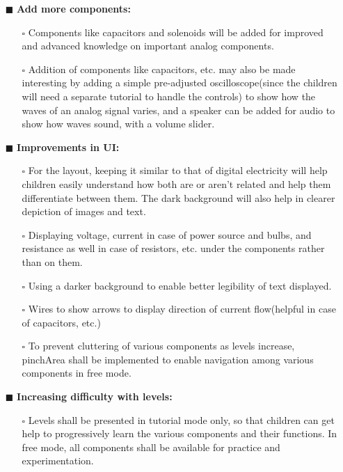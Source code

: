\documentclass[preprint,12pt]{elsarticle}
\begin{document}
\begin{itemize}
		\item[$\blacksquare$] \textbf{Add more components:}
			
			\begin{itemize}
			\item[$\square$] {Components like capacitors and solenoids will be added for improved and advanced knowledge on important analog components.}
			
			\item[$\square$] {Addition of components like capacitors, etc. may also be made interesting by adding a simple pre-adjusted oscilloscope(since the children will need a separate tutorial to handle the controls) to show how the waves of an analog signal varies, and a speaker can be added for audio to show how waves sound, with a volume slider.}
			\end{itemize}
			
		\item[$\blacksquare$] \textbf{Improvements in UI:}
			\begin{itemize}
			\item[$\square$] {For the layout, keeping it similar to that of digital electricity will help children easily understand how both are or aren’t related and help them differentiate between them. The dark background will also help in clearer depiction of images and text.}
			\item[$\square$] {Displaying voltage, current in case of power source and bulbs, and resistance as well in case of resistors, etc. under the components rather than on them.}
			
			\item[$\square$] {Using a darker background to enable better legibility of text displayed.}
			
			\item[$\square$] {Wires to show arrows to display direction of current flow(helpful in case of capacitors, etc.)}
			
			\item[$\square$] {To prevent cluttering of various components as levels increase, pinchArea shall be implemented to enable navigation among various components in free mode.}\\
			\end{itemize}
			
		\item[$\blacksquare$] \textbf{Increasing difficulty with levels:}
			\begin{itemize}
			\item[$\square$] {Levels shall be presented in tutorial mode only, so that children can get help to progressively learn the various components and their functions. In free mode, all components shall be available for practice and experimentation.}
			

\end{itemize}
\end{itemize}
\end{document}
